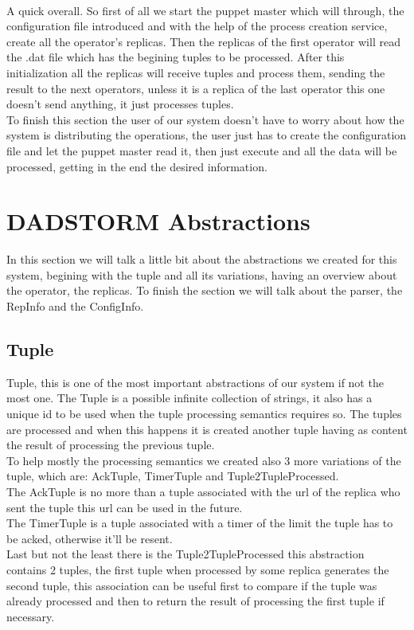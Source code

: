 \documentclass[times, 10pt, twocolumn]{article}
\begin{document}
\\A quick overall. So first of all we start the puppet master which will through, the configuration file introduced and with the help of the process creation service, create all the operator's replicas. Then the replicas of the first operator will read the .dat file which has the begining tuples to be processed. After this initialization all the replicas will receive tuples and process them, sending the result to the next operators, unless it is a replica of the last operator this one doesn't send anything, it just processes tuples.
\\To finish this section the user of our system doesn't have to worry about how the system is distributing the operations, the user just has to create the configuration file and let the puppet master read it, then just execute and all the data will be processed, getting in the end the desired information.



\section{DADSTORM Abstractions}
In this section we will talk a little bit about the abstractions we created for this system, begining with the tuple and all its variations, having an overview about the operator, the replicas. To finish the section we will talk about the parser, the RepInfo and the ConfigInfo.



\subsection{Tuple}
Tuple, this is one of the most important abstractions of our system if not the most one. The Tuple is a possible infinite collection of strings, it also has a unique id to be used when the tuple processing semantics requires so. The tuples are processed and when this happens it is created another tuple having as content the result of processing the previous tuple. 
\\To help mostly the processing semantics we created also 3 more variations of the tuple, which are: AckTuple, TimerTuple and Tuple2TupleProcessed. 
\\The AckTuple is no more than a tuple associated with the url of the replica who sent the tuple this url can be used in the future. 
\\The TimerTuple is a tuple associated with a timer of the limit the tuple has to be acked, otherwise it'll be resent. 
\\Last but not the least there is the Tuple2TupleProcessed this abstraction contains 2 tuples, the first tuple when processed by some replica generates the second tuple, this association can be useful first to compare if the tuple was already processed and then to return the result of processing the first tuple if necessary.
\end{document}
